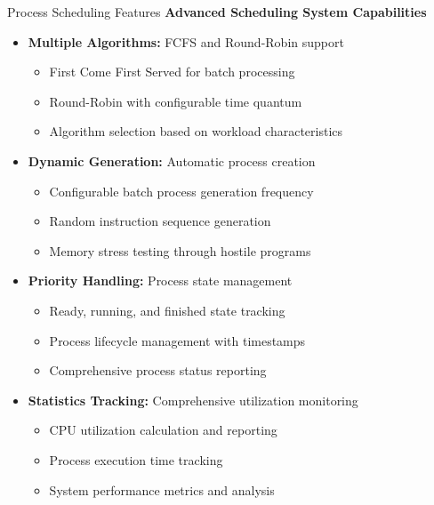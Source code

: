 \documentclass[10pt]{beamer}
\begin{document}
\begin{frame}{Process Scheduling Features}
    \textbf{Advanced Scheduling System Capabilities}
    
    \begin{itemize}
        \item \textbf{Multiple Algorithms:} FCFS and Round-Robin support
        \begin{itemize}
            \item First Come First Served for batch processing
            \item Round-Robin with configurable time quantum
            \item Algorithm selection based on workload characteristics
        \end{itemize}
        
        \item \textbf{Dynamic Generation:} Automatic process creation
        \begin{itemize}
            \item Configurable batch process generation frequency
            \item Random instruction sequence generation
            \item Memory stress testing through hostile programs
        \end{itemize}
        
        \item \textbf{Priority Handling:} Process state management
        \begin{itemize}
            \item Ready, running, and finished state tracking
            \item Process lifecycle management with timestamps
            \item Comprehensive process status reporting
        \end{itemize}
        
        \item \textbf{Statistics Tracking:} Comprehensive utilization monitoring
        \begin{itemize}
            \item CPU utilization calculation and reporting
            \item Process execution time tracking
            \item System performance metrics and analysis
        \end{itemize}
    \end{itemize}
\end{frame}
\end{document}
